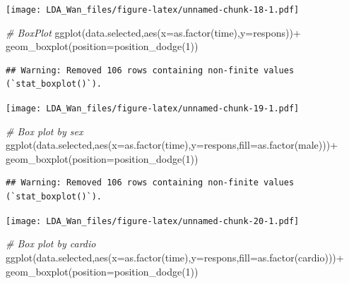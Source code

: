 \documentclass[
]{article}
\newenvironment{Shaded}{\begin{snugshade}}{\end{snugshade}}
\newcommand{\AttributeTok}[1]{\textcolor[rgb]{0.77,0.63,0.00}{#1}}
\newcommand{\CommentTok}[1]{\textcolor[rgb]{0.56,0.35,0.01}{\textit{#1}}}
\newcommand{\DecValTok}[1]{\textcolor[rgb]{0.00,0.00,0.81}{#1}}
\newcommand{\FunctionTok}[1]{\textcolor[rgb]{0.00,0.00,0.00}{#1}}
\newcommand{\NormalTok}[1]{#1}
\newcommand{\SpecialCharTok}[1]{\textcolor[rgb]{0.00,0.00,0.00}{#1}}
\begin{document}
\texttt{[image: LDA\_Wan\_files/figure-latex/unnamed-chunk-18-1.pdf]}

\begin{Shaded}
\begin{Highlighting}[]
\CommentTok{\# BoxPlot}
\FunctionTok{ggplot}\NormalTok{(data.selected,}\FunctionTok{aes}\NormalTok{(}\AttributeTok{x=}\FunctionTok{as.factor}\NormalTok{(time),}\AttributeTok{y=}\NormalTok{respons))}\SpecialCharTok{+} \FunctionTok{geom\_boxplot}\NormalTok{(}\AttributeTok{position=}\FunctionTok{position\_dodge}\NormalTok{(}\DecValTok{1}\NormalTok{))}
\end{Highlighting}
\end{Shaded}

\begin{verbatim}
## Warning: Removed 106 rows containing non-finite values (`stat_boxplot()`).
\end{verbatim}

\texttt{[image: LDA\_Wan\_files/figure-latex/unnamed-chunk-19-1.pdf]}

\begin{Shaded}
\begin{Highlighting}[]
\CommentTok{\# Box plot by sex}
\FunctionTok{ggplot}\NormalTok{(data.selected,}\FunctionTok{aes}\NormalTok{(}\AttributeTok{x=}\FunctionTok{as.factor}\NormalTok{(time),}\AttributeTok{y=}\NormalTok{respons,}\AttributeTok{fill=}\FunctionTok{as.factor}\NormalTok{(male)))}\SpecialCharTok{+} 
  \FunctionTok{geom\_boxplot}\NormalTok{(}\AttributeTok{position=}\FunctionTok{position\_dodge}\NormalTok{(}\DecValTok{1}\NormalTok{))}
\end{Highlighting}
\end{Shaded}

\begin{verbatim}
## Warning: Removed 106 rows containing non-finite values (`stat_boxplot()`).
\end{verbatim}

\texttt{[image: LDA\_Wan\_files/figure-latex/unnamed-chunk-20-1.pdf]}

\begin{Shaded}
\begin{Highlighting}[]
\CommentTok{\# Box plot by cardio}
\FunctionTok{ggplot}\NormalTok{(data.selected,}\FunctionTok{aes}\NormalTok{(}\AttributeTok{x=}\FunctionTok{as.factor}\NormalTok{(time),}\AttributeTok{y=}\NormalTok{respons,}\AttributeTok{fill=}\FunctionTok{as.factor}\NormalTok{(cardio)))}\SpecialCharTok{+} 
  \FunctionTok{geom\_boxplot}\NormalTok{(}\AttributeTok{position=}\FunctionTok{position\_dodge}\NormalTok{(}\DecValTok{1}\NormalTok{))}
\end{Highlighting}
\end{Shaded}
\end{document}
